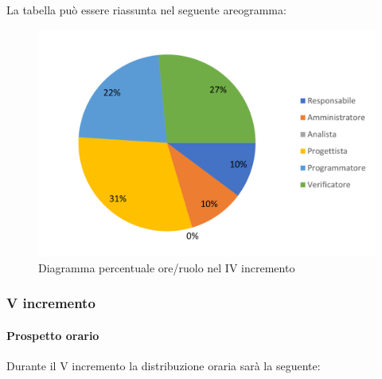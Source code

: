 La tabella può essere riassunta nel seguente areogramma:
\begin{figure}[H]
	\centering
	\includegraphics[width=0.8\linewidth]{res/images/preventivo/dettaglio_implementazione/1-2.png}
	\caption{Diagramma percentuale ore/ruolo nel IV incremento}
	\label{fig:diagramma costi ruolo  IV incremento}
\end{figure}

\subsubsection{V incremento}
\paragraph{Prospetto orario}
Durante il V incremento la distribuzione oraria sarà la seguente:

